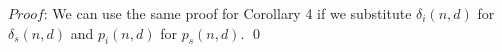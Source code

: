 $Proof$: We can use the same proof for Corollary 4 if we substitute $\delta_i(n,d)$ for $\delta_s(n,d)$ and $p_i(n,d)$ for $p_s(n,d)$. \qed


\begin{comment}
Corollary 2 does not apply to \purge recovery because the  $\delta_i(n,d) < \delta_f(n,d)$ may not necessarily be satisfied. This is the case
because \infinity messages are not possible with \purge.

These results are useful in understanding recovery using \second and \cpr in cases where link costs remain fixed. With either algorithm,
our proofs imply that the general trend is for all \minv to increase from their value at the start of recovery up 
to their value when recovery has completed. Specifically, as a manifestation of the \infinity problem, paths using \badvector or \oldvector 
(with \cpr only \oldvector can be used as discussed in Section \ref{subsec:cpr}) are shared,
causing least cost paths to count up to their final value.  
There is one exception to this trend.  A node may learn of a new least 
cost path that uses \badvector or \oldvector with a cost less than any of its current least cost path, causing its least cost path to decrease. 

By Claim 1, \purge recovery also starts with \minv values less than or equal to their final value. However, for \purge \minv values actually 
count down from the $\infty$ costs set after the purge phase. 


We leverage these characterizations to explain our simulation results in the following section.
\end{comment}







